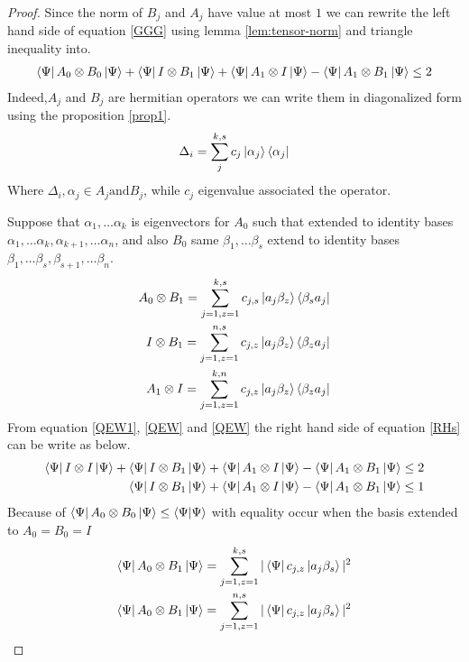 \begin{proof}

Since the norm of $B_j$ and $A_j$  have value  at most $1$ we can rewrite the left hand side of equation  \ref{GGG} using lemma \ref{lem:tensor-norm}  and triangle inequality into. 
\begin{align}\label{RHs}
 \bra{\Psi}A_0\otimes B_0\ket{\Psi}+ \bra{\Psi} I\otimes B_1\ket{\Psi}+ \bra{\Psi}A_1\otimes I\ket{\Psi}-  \bra{\Psi}A_1\otimes B_1 \ket{\Psi} \leq 2
\end{align}
 Indeed,$A_j$ and $B_j$ are hermitian operators we can write them in diagonalized form using the proposition \ref{prop1}. 
$$\Delta_{i}=\sum_{j}^{k,s}c_j \ket{\alpha_j}\bra{\alpha_j}$$
Where $\Delta_{i},\alpha_j \in A_j \text{and} B_j$, while $c_j$  eigenvalue associated the operator.

Suppose that  $\alpha_1,\dots \alpha_k$ is eigenvectors for $A_0$ such that extended to identity bases $\alpha_1,\dots \alpha_k,\alpha_{k+1},\dots \alpha_{n}$,
and also  $B_0$ same $\beta_1,\dots \beta_s$ extend to identity bases $\beta_1,\dots \beta_s,\beta_{s+1},\dots \beta_n$. 
\begin{align}
A_0 \otimes B_1=\sum_{j=1,z=1}^{k,s}c_{j,s}\ket{a_j\beta _z} \bra{\beta_s a_j }\label{QEW}\\
I \otimes B_1=\sum_{j=1,z=1}^{n,s}c_{j,z}\ket{a_j\beta _z} \bra{\beta_z a_j }\label{QEW1}\\
A_1 \otimes I=\sum_{j=1,z=1}^{k,n}c_{j,z}\ket{a_j\beta _z} \bra{\beta_z a_j }\label{QEW2}
\end{align}
From equation \ref{QEW1}, \ref{QEW} and \ref{QEW} the right hand  side of  equation  \ref{RHs} can be write as below.
\begin{align}\label{NAND:TINEQ}
\bra{\Psi} I\otimes I\ket{\Psi}+\bra{\Psi}I\otimes B_1\ket{\Psi}+\bra{\Psi}A_1\otimes I\ket{\Psi}-\bra{\Psi}A_1\otimes B_1 \ket{\Psi} \leq 2\\
\bra{\Psi}I\otimes B_1\ket{\Psi}+\bra{\Psi}A_1\otimes I\ket{\Psi}-\bra{\Psi}A_1\otimes B_1 \ket{\Psi} \leq 1
\end{align}
Because of $\bra{\Psi} A_0\otimes B_0\ket{\Psi} \leq \bra {\Psi} \ket{\Psi}$ with equality occur when the basis extended to $A_0=B_0=I$  
\begin{align*}
\bra{\Psi} A_0\otimes B_1\ket{\Psi}=\sum_{j=1,z=1}^{k,s}|\bra{\Psi}c_{j,z}\ket{a_j\beta _s}|^2\\
\bra{\Psi} A_0\otimes B_1\ket{\Psi}=\sum_{j=1,z=1}^{n,s}|\bra{\Psi}c_{j,z}\ket{a_j\beta _s}|^2
\end{align*}


\end{proof}
